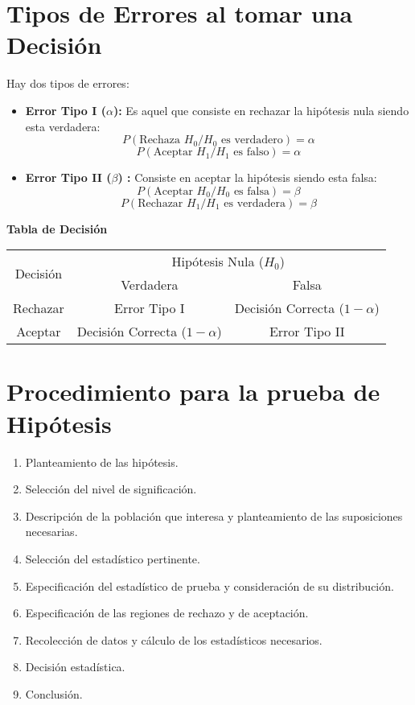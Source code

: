\section{Tipos de Errores al tomar una Decisión}
Hay dos tipos de errores:
\begin{itemize}
\item \textbf{Error Tipo I ($\alpha$):} Es aquel que consiste en rechazar la hipótesis nula siendo esta verdadera:
$$ P(\text{Rechaza }H_0 / H_0 \text{ es verdadero}) = \alpha $$
$$ P(\text{Aceptar }H_1 / H_1 \text{ es falso}) = \alpha $$
\item \textbf{Error Tipo II ($\beta$) :} Consiste en aceptar la hipótesis siendo esta falsa:
$$ P(\text{Aceptar }H_0 / H_0 \text{ es falsa}) = \beta $$
$$ P(\text{Rechazar }H_1 / H_1 \text{ es verdadera}) = \beta $$
\end{itemize}
\textbf{Tabla de Decisión}  \\
\begin{table}[]
\begin{center}
\begin{tabular}{|c|c|c|}
\hline
\multirow{2}{*}{Decisión} & \multicolumn{2}{c|}{Hipótesis Nula ($H_0$)}                     \\ \cline{2-3} 
                          & Verdadera                      & Falsa                          \\ \hline
Rechazar                  & Error Tipo I                   & Decisión Correcta ($1-\alpha$) \\ \hline
Aceptar                   & Decisión Correcta ($1-\alpha$) & Error Tipo II                  \\ \hline
\end{tabular}
\end{center}
\end{table}

\section{Procedimiento para la prueba de Hipótesis}
\begin{enumerate}
\item Planteamiento de las hipótesis.
\item Selección del nivel de significación.
\item Descripción de la población que interesa y planteamiento de las suposiciones necesarias.
\item Selección del estadístico pertinente.
\item Especificación del estadístico de prueba y consideración de su distribución.
\item Especificación de las regiones de rechazo y de aceptación.
\item  Recolección de datos y cálculo de los estadísticos necesarios.
\item Decisión estadística.
\item Conclusión.
\end{enumerate}